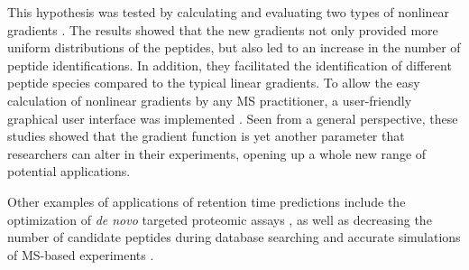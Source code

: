 \documentclass[a4paper]{article}
\begin{document}
This hypothesis was tested by calculating and evaluating two types of
nonlinear gradients \cite{gradopt1}. The results showed that the new
gradients not only provided more uniform distributions of the
peptides, but also led to an increase in the number of peptide
identifications. In addition, they facilitated the identification of
different peptide species compared to the typical linear gradients. To
allow the easy calculation of nonlinear gradients by any MS
practitioner, a user-friendly graphical user interface was implemented
\cite{gradopt2}.  Seen from a general perspective, these studies
showed that the gradient function is yet another parameter that
researchers can alter in their experiments, opening up a whole new
range of potential applications.

Other examples of applications of retention time predictions include
the optimization of {\em de novo} targeted proteomic assays
\cite{bertsch2010}, as well as decreasing the number of candidate
peptides during database searching \cite{lobas2013} and accurate
simulations of MS-based experiments \cite{bielow2011}.



 

\end{document}
